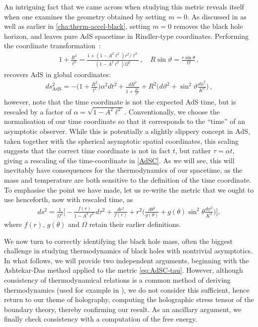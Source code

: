 \documentclass[
twoside,
openright,
frontopenright,
]{dmathesis}
\newcommand{\tcr}{\textcolor{red}}
\begin{document}
An intriguing fact that we came across when studying this metric reveals itself
when one examines the geometry obtained by setting $m=0$. As discussed in
\cite{Appels:2017xoe,Gregory:2017ogk} as well as earlier in
\cref{cha:therm-accel-black}, setting $m=0$ removes the black hole horizon, and
leaves pure AdS spacetime in Rindler-type coordinates.  Performing the
coordinate transformation~\cite{Podolsky:2002nk}:
\begin{align}
1+\frac{R^2}{\ell^2}=\frac{1+(1-A^2\ell^2)r^2/\ell^2}{(1-A^2\ell^2)\Omega^2}\,, \quad
R\sin\vartheta=\frac{r\sin\theta}{\Omega}\,,
\end{align}
recovers AdS in global coordinates:
\begin{align}
\label{gAdS}
 ds^2_\mathrm{AdS}= -\Big(1+\frac{R^2}{\ell^2}\Big) \alpha^2
dt^2+\frac{dR^2}{1+\frac{R^2}{\ell^2}}  +R^2\Big(d\vartheta^2+\sin^2\vartheta
\frac{d\phi^2}{K^2}\Big)\,,
\end{align}
however, note that the time coordinate is not the expected AdS time, but is
rescaled by a factor of $\alpha = \sqrt{1-A^2 \ell^2}$. Conventionally, we
choose the normalisation of our time coordinate so that it corresponds to the
``time'' of an asymptotic observer. While this is potentially a slightly
slippery concept in AdS, taken together with the spherical asymptotic spatial
coordinates, this scaling suggests that the correct time coordinate is not in
fact $t$, but rather $\tau=\alpha t$, giving a rescaling of the time-coordinate
in \eqref{AdSC}. As we will see, this will inevitably have consequences for the
thermodynamics of our spacetime, as the mass and temperature are both sensitive
to the definition of the time coordinate. To emphasise the point we have made,
let us re-write the metric that we ought to use henceforth, now with rescaled
time, as
\begin{align}\label{eq:AdSC-tau}
ds^2=\frac{1}{\Omega^2}\bigg[ -\frac{f(r)}{1-A^2\ell^2}d\tau^2+\frac{dr^2}{f(r)}
+r^2\Big(\frac{d\theta^2}{g(\theta)}
+g(\theta)\sin^2\theta\frac{d\phi^2}{K^2}\Big)\bigg],
\end{align}
where $f(r)$, $g(\theta)$ and $\Omega$ retain their earlier
definitions.

We now turn to correctly identifying the black hole mass, often the biggest
challenge in studying thermodynamics of black holes with nontrivial
asymptotics. In what follows, we will provide two independent
arguments, %
beginning with the Ashtekar-Das method \cite{Ashtekar:1999jx,Das:2000cu} applied
to the metric \eqref{eq:AdSC-tau}. However, although consistency of thermodynamical
relations is a common method of deriving thermodynamics (used for {example in
  \cite{Astorino:2016ybm}}), we do not consider this sufficient, hence return to
our theme of holography, computing the holographic stress tensor of the boundary
theory, thereby confirming our result.  As an ancillary argument, we finally
check consistency with a computation of the free energy.
\end{document}
